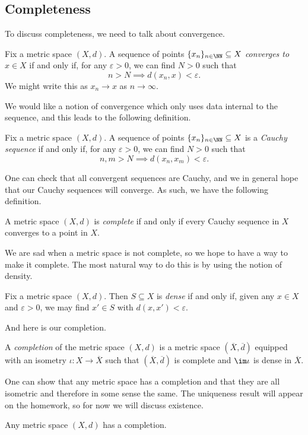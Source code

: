 \documentclass[../notes.tex]{subfiles}
\begin{document}
\subsection{Completeness}
To discuss completeness, we need to talk about convergence.
\begin{definition}[Converge]
	Fix a metric space $(X,d)$. A sequence of points $\{x_n\}_{n\in\NN}\subseteq X$ \textit{converges to} $x\in X$ if and only if, for any $\varepsilon>0$, we can find $N>0$ such that
	\[n>N\implies d(x_n,x)<\varepsilon.\]
	We might write this as $x_n\to x$ as $n\to\infty$.
\end{definition}
We would like a notion of convergence which only uses data internal to the sequence, and this leads to the following definition.
\begin{definition}[Cauchy]
	Fix a metric space $(X,d)$. A sequence of points $\{x_n\}_{n\in\NN}\subseteq X$ is a \textit{Cauchy sequence} if and only if, for any $\varepsilon>0$, we can find $N>0$ such that
	\[n,m>N\implies d(x_n,x_m)<\varepsilon.\]
\end{definition}
One can check that all convergent sequences are Cauchy, and we in general hope that our Cauchy sequences will converge. As such, we have the following definition.
\begin{definition}[Complete]
	A metric space $(X,d)$ is \textit{complete} if and only if every Cauchy sequence in $X$ converges to a point in $X$.	
\end{definition}
We are sad when a metric space is not complete, so we hope to have a way to make it complete. The most natural way to do this is by using the notion of density.
\begin{definition}[Density]
	Fix a metric space $(X,d)$. Then $S\subseteq X$ is \textit{dense} if and only if, given any $x\in X$ and $\varepsilon>0$, we may find $x'\in S$ with $d(x,x')<\varepsilon$.
\end{definition}
And here is our completion.
\begin{definition}[Completion]
	A \textit{completion} of the metric space $(X,d)$ is a metric space $(\overline X,\overline d)$ equipped with an isometry $\iota\colon X\to\overline X$ such that $(\overline X,\overline d)$ is complete and $\im\iota$ is dense in $\overline X$.
\end{definition}
One can show that any metric space has a completion and that they are all isometric and therefore in some sense the same. The uniqueness result will appear on the homework, so for now we will discuss existence.
\begin{theorem}
	Any metric space $(X,d)$ has a completion.
\end{theorem}
\end{document}
